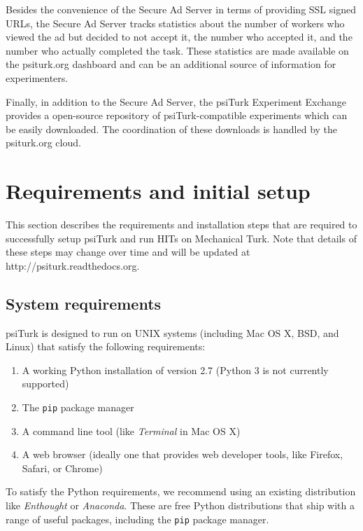 \documentclass[twocolumn]{svjour3}          %
\newcommand{\psiturk}[0]{\textsf{psiTurk}}
\begin{document}
Besides the convenience of the Secure Ad Server in terms of providing
SSL signed URLs, the Secure Ad Server tracks statistics about the
number of workers who viewed the ad but decided to not accept it, the
number who accepted it, and the number who actually completed the task.
These statistics are made available on the \textsf{psiturk.org} dashboard
and can be an additional source of information for experimenters.

Finally, in addition to the Secure Ad Server, the \psiturk{} Experiment Exchange provides
a open-source repository of \psiturk{}-compatible experiments which can be 
easily downloaded.  The coordination of these downloads is handled by the \textsf{psiturk.org} cloud. 


\section{Requirements and initial setup}
This section describes the requirements and installation steps that are required to successfully setup \psiturk{} and run
HITs on Mechanical Turk. Note that details of these steps may change over time and will be updated at \textsf{http://psiturk.readthedocs.org}.

\subsection{System requirements}
\psiturk{} is designed to run on UNIX systems (including Mac OS X, BSD, and Linux) that satisfy the following requirements:

\begin{enumerate}
\item A working Python installation of version 2.7 (Python 3 is not currently supported)
\item The \texttt{pip} package manager 
\item A command line tool (like \emph{Terminal} in Mac OS X)
\item A web browser (ideally one that provides web developer tools, like Firefox, Safari, or Chrome)
\end{enumerate}

To satisfy the Python requirements, we recommend using an existing distribution like \emph{Enthought} or \emph{Anaconda}. These are free
Python distributions that ship with a range of useful packages, including the \texttt{pip} package manager. 
\end{document}
